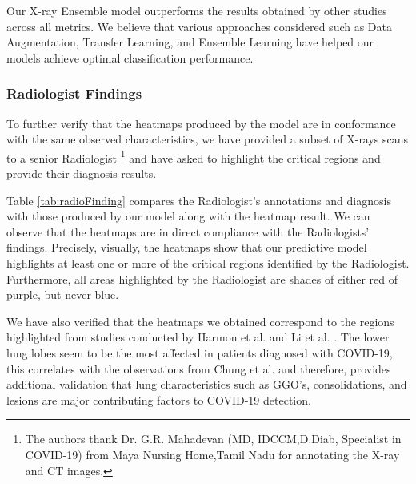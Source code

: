 Our X-ray Ensemble model outperforms the results obtained by other studies across all metrics. We believe that various approaches considered such as Data Augmentation, Transfer Learning, and Ensemble Learning have helped our models achieve optimal classification performance.
\vspace{-1em}

\subsubsection{Radiologist Findings} \label{rfxray}

To further verify that the heatmaps produced by the model are in conformance with the same observed characteristics, we have provided a subset of X-rays scans to a senior Radiologist \footnote{The authors thank Dr. G.R. Mahadevan (MD, IDCCM,D.Diab, Specialist in COVID-19) from Maya Nursing Home,Tamil Nadu for annotating the X-ray and CT images.} and have asked to highlight the critical regions and provide their diagnosis results. 

Table \ref{tab:radioFinding} compares the Radiologist's annotations and diagnosis with those produced by our model along with the heatmap result.
We can observe that the heatmaps are in direct compliance with the Radiologists’ findings. Precisely, visually, the heatmaps show that our predictive model highlights at least one or more of the critical regions identified by the Radiologist. Furthermore, all areas highlighted by the Radiologist are shades of either red of purple, but never blue.

We have also verified that the heatmaps we obtained correspond to the regions highlighted from studies conducted by Harmon et al. \cite{HSX+2020} and Li et al. \cite{LLL+2020}. The lower lung lobes seem to be the most affected in patients diagnosed with COVID-19, this correlates with the observations from Chung et al. \cite{CMA+2020} and therefore, provides additional validation that lung characteristics such as GGO’s, consolidations, and lesions are major contributing factors to COVID-19 detection.


